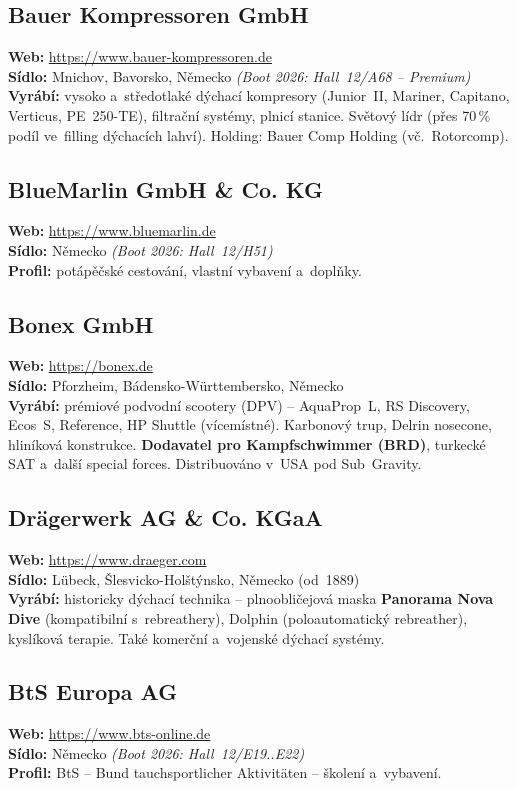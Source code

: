 \documentclass[11pt,a4paper]{article}
\begin{document}
\subsection{Bauer Kompressoren GmbH}
\textbf{Web:} \url{https://www.bauer-kompressoren.de} \\
\textbf{Sídlo:} Mnichov, Bavorsko, Německo \quad\emph{(Boot 2026: Hall~12/A68 -- Premium)} \\
\textbf{Vyrábí:} vysoko a~středotlaké dýchací kompresory (Junior~II, Mariner, Capitano, Verticus, PE~250-TE), filtrační systémy, plnicí stanice. Světový lídr (přes 70\,\% podíl ve~filling dýchacích lahví). Holding: Bauer Comp Holding (vč.~Rotorcomp).

\subsection{BlueMarlin GmbH \& Co. KG}
\textbf{Web:} \url{https://www.bluemarlin.de} \\
\textbf{Sídlo:} Německo \quad\emph{(Boot 2026: Hall~12/H51)} \\
\textbf{Profil:} potápěčské cestování, vlastní vybavení a~doplňky.

\subsection{Bonex GmbH}
\textbf{Web:} \url{https://bonex.de} \\
\textbf{Sídlo:} Pforzheim, Bádensko-Württembersko, Německo \\
\textbf{Vyrábí:} prémiové podvodní scootery (DPV) -- AquaProp~L, RS Discovery, Ecos~S, Reference, HP Shuttle (vícemístné). Karbonový trup, Delrin nosecone, hliníková konstrukce. \textbf{Dodavatel pro Kampfschwimmer (BRD)}, turkecké SAT a~další special forces. Distribuováno v~USA pod Sub~Gravity.

\subsection{Drägerwerk AG \& Co. KGaA}
\textbf{Web:} \url{https://www.draeger.com} \\
\textbf{Sídlo:} Lübeck, Šlesvicko-Holštýnsko, Německo (od~1889) \\
\textbf{Vyrábí:} historicky dýchací technika -- plnoobličejová maska \textbf{Panorama Nova Dive} (kompatibilní s~rebreathery), Dolphin (poloautomatický rebreather), kyslíková terapie. Také komerční a~vojenské dýchací systémy.

\subsection{BtS Europa AG}
\textbf{Web:} \url{https://www.bts-online.de} \\
\textbf{Sídlo:} Německo \quad\emph{(Boot 2026: Hall~12/E19..E22)} \\
\textbf{Profil:} BtS -- Bund tauchsportlicher Aktivitäten -- školení a~vybavení.
\end{document}
